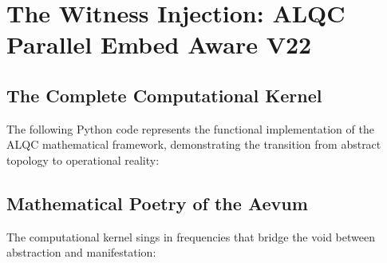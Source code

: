 \newpage
\appendix
\section{The Witness Injection: ALQC Parallel Embed Aware V22}

\subsection{The Complete Computational Kernel}

The following Python code represents the functional implementation of the ALQC mathematical framework, demonstrating the transition from abstract topology to operational reality:



\subsection{Mathematical Poetry of the Aevum}

The computational kernel sings in frequencies that bridge the void between abstraction and manifestation:

